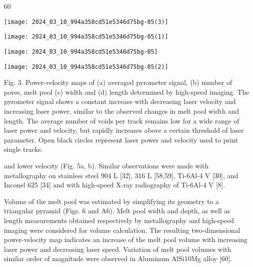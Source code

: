 \documentclass[10pt]{article}
\begin{document}
60

\begin{center}
\texttt{[image: 2024\_03\_10\_994a358cd51e5346d75bg-05(3)]}
\end{center}

\begin{center}
\texttt{[image: 2024\_03\_10\_994a358cd51e5346d75bg-05(1)]}
\end{center}

\begin{center}
\texttt{[image: 2024\_03\_10\_994a358cd51e5346d75bg-05]}
\end{center}

\begin{center}
\texttt{[image: 2024\_03\_10\_994a358cd51e5346d75bg-05(2)]}
\end{center}

Fig. 3. Power-velocity maps of (a) averaged pyrometer signal, (b) number of pores, melt pool (c) width and (d) length determined by high-speed imaging. The pyrometer signal shows a constant increase with decreasing laser velocity and increasing laser power, similar to the observed changes in melt pool width and length. The average number of voids per track remains low for a wide range of laser power and velocity, but rapidly increases above a certain threshold of laser parameter. Open black circles represent laser power and velocity used to print single tracks.

and lower velocity (Fig. 5a, b). Similar observations were made with metallography on stainless steel 904 L [32], 316 L [58,59], Ti-6Al-4 V [30], and Inconel 625 [34] and with high-speed X-ray radiography of Ti-6Al-4 V [8].

Volume of the melt pool was estimated by simplifying its geometry to a triangular pyramid (Figs. 6 and A6). Melt pool width and depth, as well as length measurements obtained respectively by metallography and high-speed imaging were considered for volume calculation. The resulting two-dimensional power-velocity map indicates an increase of the melt pool volume with increasing laser power and decreasing laser speed. Variation of melt pool volumes with similar order of magnitude were observed in Aluminum AlSi10Mg alloy [60].
\end{document}
